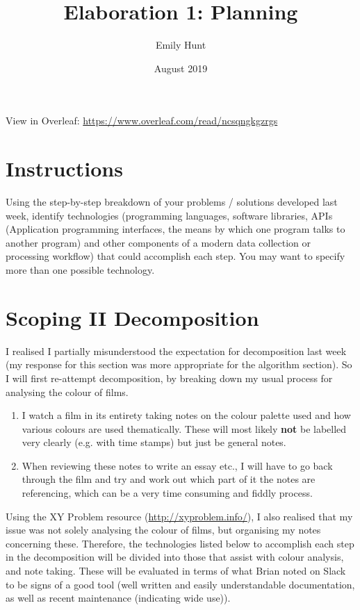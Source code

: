 \documentclass{article}
\title{\textbf{Elaboration 1: Planning}}
\author{Emily Hunt}
\date{August 2019}
\begin{document}
\maketitle

View in Overleaf: \url{https://www.overleaf.com/read/ncsqngkgzrgs}

\section*{Instructions}
Using the step-by-step breakdown of your problems / solutions developed last week, identify technologies (programming languages, software libraries, APIs (Application programming interfaces, the means by which one program talks to another program) and other components of a modern data collection or processing workflow) that could accomplish each step. You may want to specify more than one possible technology. 

\section*{Scoping II Decomposition}
I realised I partially misunderstood the expectation for decomposition last week (my response for this section was more appropriate for the algorithm section). So I will first re-attempt decomposition, by breaking down my usual process for analysing the colour of films.

\begin{enumerate}
    \item I watch a film in its entirety taking notes on the colour palette used and how various colours are used thematically. These will most likely \textbf{not} be labelled very clearly (e.g. with time stamps) but just be general notes.
    \item When reviewing these notes to write an essay etc., I will have to go back through the film and try and work out which part of it the notes are referencing, which can be a very time consuming and fiddly process.
\end{enumerate} 

Using the XY Problem resource (\url{http://xyproblem.info/}), I also realised that my issue was not solely analysing the colour of films, but organising my notes concerning these. Therefore, the technologies listed below to accomplish each step in the decomposition will be divided into those that assist with colour analysis, and note taking. These will be evaluated in terms of what Brian noted on Slack to be signs of a good tool (well written and easily understandable documentation, as well as recent maintenance (indicating wide use)).
\end{document}
